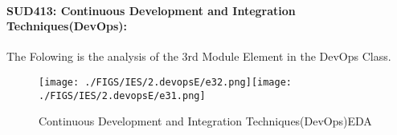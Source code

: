 \documentclass[12pt]{extreport}
\begin{document}

\paragraph{\large SUD413: Continuous Development and Integration Techniques(DevOps):\\
}
The Folowing is the analysis of the 3rd Module Element in the DevOps Class.

\begin{figure}[H]
	\centering
	\texttt{[image: ./FIGS/IES/2.devopsE/e32.png]}\texttt{[image: ./FIGS/IES/2.devopsE/e31.png]}
	\caption{Continuous Development and Integration Techniques(DevOps)EDA}
	\label{fig:23}
\end{figure}


\end{document}
